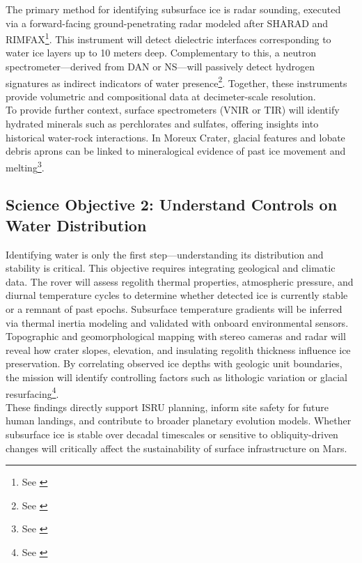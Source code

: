 The primary method for identifying subsurface ice is radar sounding, executed via a forward-facing ground-penetrating radar modeled after SHARAD and RIMFAX\footnote{See \cite{plaut_2007_subsurface, putzig_2012_stratigraphy}}. This instrument will detect dielectric interfaces corresponding to water ice layers up to 10 meters deep. Complementary to this, a neutron spectrometer—derived from DAN or NS—will passively detect hydrogen signatures as indirect indicators of water presence\footnote{See \cite{nasa_rad}}. Together, these instruments provide volumetric and compositional data at decimeter-scale resolution. \\

To provide further context, surface spectrometers (VNIR or TIR) will identify hydrated minerals such as perchlorates and sulfates, offering insights into historical water-rock interactions. In Moreux Crater, glacial features and lobate debris aprons can be linked to mineralogical evidence of past ice movement and melting\footnote{See \cite{bramson_2015_excess, mellon_1995_ground_ice}}.

\subsection*{Science Objective 2: Understand Controls on Water Distribution}

Identifying water is only the first step—understanding its distribution and stability is critical. This objective requires integrating geological and climatic data. The rover will assess regolith thermal properties, atmospheric pressure, and diurnal temperature cycles to determine whether detected ice is currently stable or a remnant of past epochs. Subsurface temperature gradients will be inferred via thermal inertia modeling and validated with onboard environmental sensors. \\

Topographic and geomorphological mapping with stereo cameras and radar will reveal how crater slopes, elevation, and insulating regolith thickness influence ice preservation. By correlating observed ice depths with geologic unit boundaries, the mission will identify controlling factors such as lithologic variation or glacial resurfacing\footnote{See \cite{head_2010_glaciation}}. \\

These findings directly support ISRU planning, inform site safety for future human landings, and contribute to broader planetary evolution models. Whether subsurface ice is stable over decadal timescales or sensitive to obliquity-driven changes will critically affect the sustainability of surface infrastructure on Mars.

